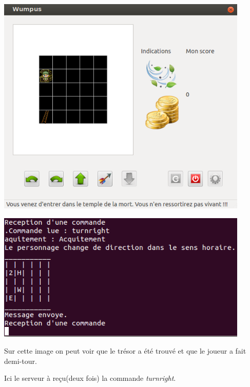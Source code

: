 \documentclass[a4paper,10pt]{article}
\begin{document}
		\begin{minipage}[t]{0.46\textwidth}
			\vspace{2pt}
			\centering
			\includegraphics[width=0.9\textwidth]{JeuxDEssais/Wumpus5.png}
		\end{minipage}
		\hfill
		\begin{minipage}[t]{0.46\textwidth}
			\vspace{30pt}
			\centering
			\includegraphics[width=0.9\textwidth]{JeuxDEssais/Serveur5.png}
		\end{minipage}

		\begin{minipage}[t]{0.46\textwidth}
			\vspace{2pt}
			Sur cette image on peut voir que le trésor a été trouvé et que le joueur a fait demi-tour.
		\end{minipage}
		\hfill
		\begin{minipage}[t]{0.46\textwidth}
			\vspace{2pt}
			Ici le serveur à reçu(deux fois) la commande \emph{turnright}.
		\end{minipage}\\
\end{document}
